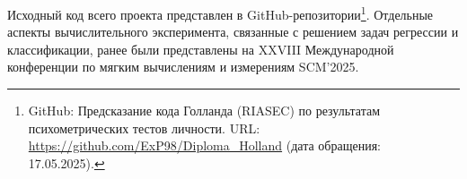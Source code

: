 Исходный код всего проекта представлен в GitHub-репозитории\footnote{\quad GitHub: Предсказание кода Голланда (RIASEC) по результатам психометрических тестов личности. URL: \url{https://github.com/ExP98/Diploma_Holland} (дата обращения: 17.05.2025).}. Отдельные аспекты вычислительного эксперимента, связанные с решением задач регрессии и классификации, ранее были представлены на XXVIII Международной конференции по мягким вычислениям и измерениям SCM'2025.
